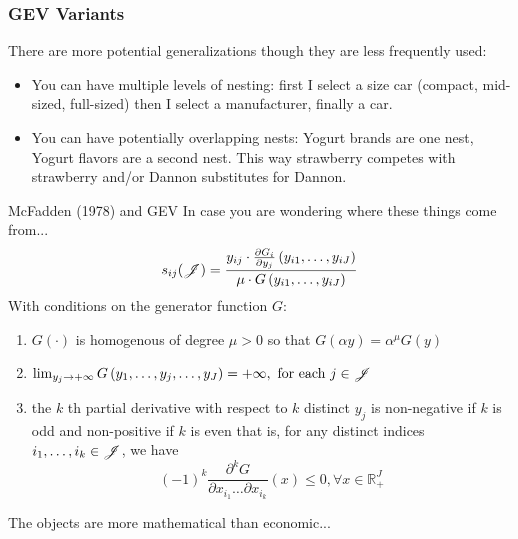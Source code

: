 \documentclass[aspectratio=169,11pt]{beamer}
\begin{document}
\begin{frame}
\frametitle{GEV Variants}
There are more potential generalizations though they are less frequently used:
 \begin{itemize}
\item You can have multiple levels of nesting: first I select a size car (compact, mid-sized, full-sized) then I select a manufacturer, finally a car.
\item You can have potentially overlapping nests: Yogurt brands are one nest, Yogurt flavors are a second nest. This way strawberry competes with strawberry and/or Dannon substitutes for Dannon.
 \end{itemize}
\end{frame}

\begin{frame}{McFadden (1978) and GEV}
In case you are wondering where these things come from...
\begin{align*}
s_{ij}(\mathscr{J})=\frac{y_{ij}\cdot  \frac{\partial G_i}{\partial y_{j}}\left(y_{i1}, \ldots, y_{iJ}\right)}{\mu \cdot G\left(y_{i1}, \ldots, y_{iJ}\right)}
\end{align*}
With conditions on the \alert{generator function} $G$:
\begin{enumerate}
\item $G(\cdot)$ is homogenous of degree $\mu > 0$ so that $G(\alpha y)=\alpha^{\mu} G(y)$
\item $\lim _{y_{j} \rightarrow+\infty} G\left(y_{1}, \ldots, y_{j}, \ldots, y_{J}\right)=+\infty, \text { for each } j \in \mathscr{J} $
\item the $k$ th partial derivative with respect to $k$ distinct $y_{j}$ is \alert{non-negative if $k$ is
odd} and \alert{non-positive if $k$ is even} that is, for any distinct indices $i_{1}, \ldots, i_{k} \in \mathscr{J}$, we have
$$
(-1)^{k} \frac{\partial^{k} G}{\partial x_{i_{1}} \ldots \partial x_{i_{k}}}(x) \leq 0, \forall x \in \mathbb{R}_{+}^{J}
$$
\end{enumerate}
The objects are more mathematical than economic...
\end{frame}
\end{document}
